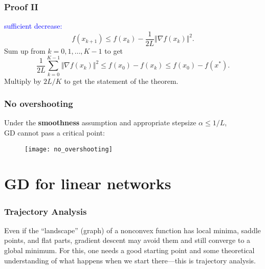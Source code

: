 \documentclass[aspectratio=149]{beamer}
\begin{document}
\begin{frame}
  \frametitle{Proof II}
  \textcolor{blue}{sufficient decrease:}
  \begin{equation}
    f(x_{k+1}) \le f(x_k) - \frac{1}{2L} \Vert \nabla f(x_k) \Vert^2.
  \end{equation}
  Sum up from $k=0, 1, \dots, K-1$ to get
  \begin{equation}
      \frac{1}{2L}\sum_{k=0}^{K-1} \Vert \nabla f(x_k) \Vert^2 \le f(x_0) - f(x_{k}) \le f(x_0) - f(x^*).
  \end{equation}
  Multiply by $2L/K$ to get the statement of the theorem.\qedhere
\end{frame}


\begin{frame}
  \frametitle{No overshooting}
  Under the \textbf{smoothness} assumption and appropriate stepsize $\alpha \le 1/L$,\\
  GD cannot pass a critical point:
  \begin{figure}[ht]
    \centering
    \texttt{[image: no\_overshooting]}
  \end{figure}
\end{frame}


\section{GD for linear networks}%
\label{sec:}

\begin{frame}
  \frametitle{Trajectory Analysis}

  Even if the “landscape” (graph) of a nonconvex function has local minima, saddle
  points, and flat parts, gradient descent may avoid them and still converge to a global
  minimum.
  For this, one needs a good starting point and some theoretical understanding of what
  happens when we start there—this is trajectory analysis.

\end{frame}
\end{document}
